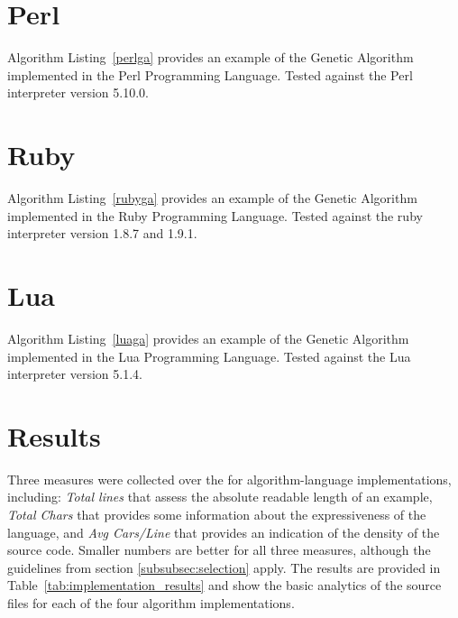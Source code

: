 \documentclass[a4paper, 11pt]{article}
\begin{document}
% 
% 
\section{Perl}
\label{sec:perl}
Algorithm Listing~\ref{perlga} provides an example of the Genetic Algorithm implemented in the Perl Programming Language. Tested against the Perl interpreter version 5.10.0.


% 
% 
\section{Ruby}
\label{sec:ruby}
Algorithm Listing~\ref{rubyga} provides an example of the Genetic Algorithm implemented in the Ruby Programming Language. Tested against the ruby interpreter version 1.8.7 and 1.9.1.


% 
% 
\section{Lua}
\label{sec:lua}
Algorithm Listing~\ref{luaga} provides an example of the Genetic Algorithm implemented in the Lua Programming Language. Tested against the Lua interpreter version 5.1.4.


% 
% 
\section{Results}
\label{sec:results}
Three measures were collected over the for algorithm-language implementations, including: \emph{Total lines} that assess the absolute readable length of an example, \emph{Total Chars} that provides some information about the expressiveness of the language, and \emph{Avg Cars/Line} that provides an indication of the density of the source code. Smaller numbers are better for all three measures, although the guidelines from section \ref{subsubsec:selection} apply.
The results are provided in Table~\ref{tab:implementation_results} and show the basic analytics of the source files for each of the four algorithm implementations.
\end{document}
